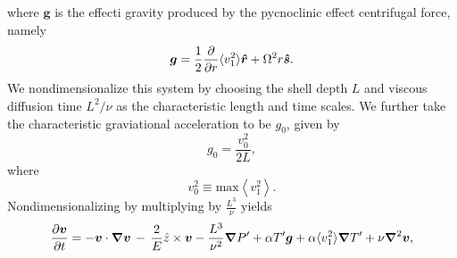 where $\boldsymbol{g}$ is the effecti gravity produced by the pycnoclinic effect centrifugal force, namely
\begin{equation}
\boldsymbol{g} = \frac{1}{2}\frac{\partial}{\partial r}\langle v_1^2\rangle\boldsymbol{\hat{r}} + \Omega^2 r\boldsymbol{\boldsymbol{\hat{s}}}  .
\end{equation}
We nondimensionalize this system by choosing the shell depth $L$ and viscous diffusion time $L^2/\nu$ as the characteristic length and time scales.   We further take the characteristic graviational acceleration to be $g_0$, given by
\begin{equation}
g_0 = \frac{v_0^2}{2 L},
\end{equation}
where 
\begin{equation}
v_0^2 \equiv \mathrm{max}\left\langle v_1^2 \right\rangle.
\end{equation}
Nondimensionalizing by multiplying by $\frac{L^3}{\nu}$ yields
\begin{equation}
\frac{ \partial \vvec }{\partial t}   =  - \vvec\cdot\boldsymbol{\nabla}\vvec
\,-\, \frac{2}{E}{\hat{z}}\times\vvec  
-\frac{L^3}{\nu^2}\boldsymbol{\nabla}P'  %
						        + \alpha T' \boldsymbol{g}
							+\alpha \langle v_1^2\rangle\boldsymbol{\nabla} T'
+ \nu\boldsymbol{\nabla}^2\vvec,
\end{equation}


\clearpage


